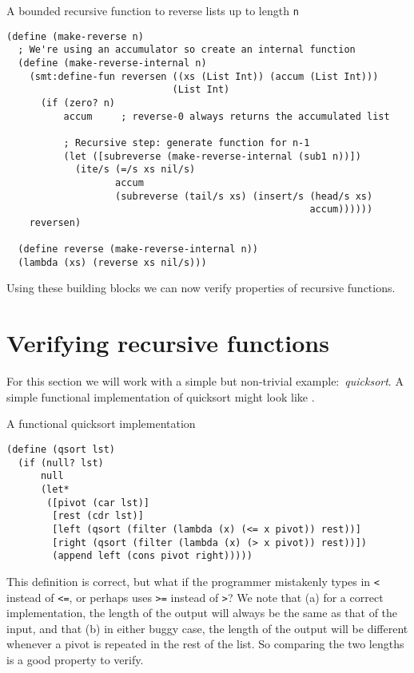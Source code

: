 \begin{program}
\caption{A bounded recursive function to reverse lists up to length \texttt{n}}
\label{fig:reverse-rkt}
\begin{verbatim}
(define (make-reverse n)
  ; We're using an accumulator so create an internal function
  (define (make-reverse-internal n)
    (smt:define-fun reversen ((xs (List Int)) (accum (List Int)))
                             (List Int)
      (if (zero? n)
          accum     ; reverse-0 always returns the accumulated list

          ; Recursive step: generate function for n-1
          (let ([subreverse (make-reverse-internal (sub1 n))])
            (ite/s (=/s xs nil/s)
                   accum
                   (subreverse (tail/s xs) (insert/s (head/s xs)
                                                     accum))))))
    reversen)

  (define reverse (make-reverse-internal n))
  (lambda (xs) (reverse xs nil/s)))
\end{verbatim}
\end{program}

Using these building blocks we can now verify properties of recursive
functions.

\section{Verifying recursive functions}

For this section we will work with a simple but non-trivial
example:~\textit{quicksort}. A simple functional implementation of quicksort
might look like .

\begin{program}
\caption{A functional quicksort implementation}
\label{fig:qsort}
\begin{verbatim}
(define (qsort lst)
  (if (null? lst)
      null
      (let*
       ([pivot (car lst)]
        [rest (cdr lst)]
        [left (qsort (filter (lambda (x) (<= x pivot)) rest))]
        [right (qsort (filter (lambda (x) (> x pivot)) rest))])
        (append left (cons pivot right)))))
\end{verbatim}
\end{program}

This definition is correct, but what if the programmer mistakenly types in
\texttt{<} instead of \texttt{<=}, or perhaps uses \texttt{>=} instead of
\texttt{>}? We note that (a) for a correct implementation, the length of the
output will always be the same as that of the input, and that (b) in either
buggy case, the length of the output will be different whenever a pivot is
repeated in the rest of the list. So comparing the two lengths is a good
property to verify.

